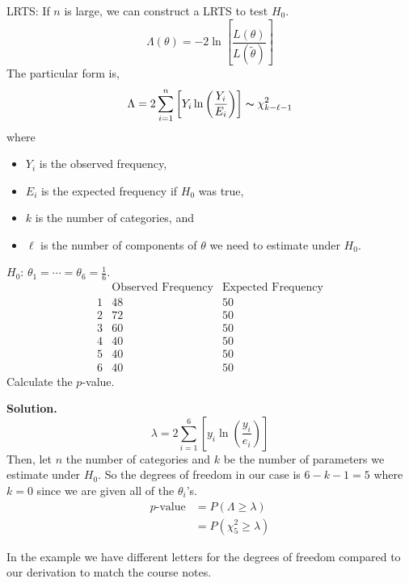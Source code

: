 LRTS: If $ n $ is large, we can construct a LRTS to test $ H_0 $.
\[ \Lambda(\theta) = -2\ln \left[ \frac{L(\theta)}{L(\tilde{\theta})} \right] \]
The particular form is,
\[ \Lambda = 2 \sum\limits_{i=1}^{n} \left[ Y_i \ln \left( \frac{Y_i}{E_i} \right) \right] \thicksim \chi^2_{k-\ell-1} \]
where
\begin{itemize}
    \item $ Y_i $ is the observed frequency,
    \item $ E_i $ is the expected frequency if $ H_0 $ was true,
    \item $ k $ is the number of categories, and
    \item $ \ell $ is the number of components of $ \theta $ we need to estimate under $ H_0 $.
\end{itemize}
\begin{exbox}
    \begin{example} $ H_0 $: $ \theta_1=\cdots=\theta_6=\frac{1}{6} $.
        \[
            \begin{array}{c|c|c|}
                  & \text{Observed Frequency} & \text{Expected Frequency} \\
                \hline
                1 & 48                        & 50                        \\
                2 & 72                        & 50                        \\
                3 & 60                        & 50                        \\
                4 & 40                        & 50                        \\
                5 & 40                        & 50                        \\
                6 & 40                        & 50
            \end{array}
        \]
        Calculate the $ p $-value.

        \textbf{Solution.}
        \[ \lambda=2 \sum\limits_{i=1}^{6} \left[ y_i \ln\left( \frac{y_i}{e_i}  \right) \right] \]
        Then, let $ n $ the number of categories and $ k $ be the number of parameters we estimate under $ H_0 $.
        So the degrees of freedom in our case is $ 6-k-1=5 $ where $ k=0 $ since we are given
        all of the $ \theta_i $'s.
        \begin{align*}
            p\text{-value}
             & = P(\Lambda\geqslant \lambda)  \\
             & = P(\chi^2_5\geqslant \lambda)
        \end{align*}
    \end{example}
\end{exbox}
\begin{remark}
    In the example we have different letters for the degrees of freedom compared to our derivation
    to match the course notes.
\end{remark}
